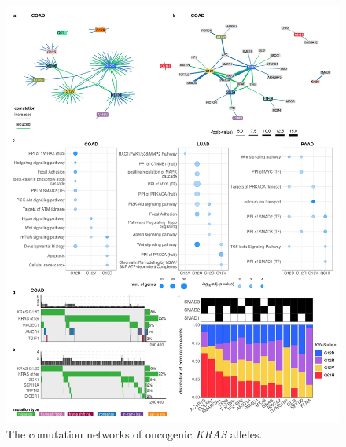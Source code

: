 \documentclass[english, 10pt, letterpaper]{article}
\newcommand{\KRAS}{\emph{KRAS}}
\begin{document}
\begin{figure}[h!]
\centering
\includegraphics[width=180mm]{figures/Fig_2.jpeg}
\caption{The comutation networks of oncogenic \KRAS{} alleles.}
\label{fig:comutation-main}
\end{figure}
\end{document}
